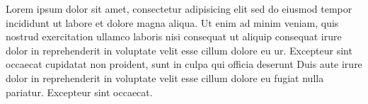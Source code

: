 \documentclass[a4paper, oneside, notitlepage, 12pt]{article}
\begin{document}
\begin{pages}
\begin{Rightside}
Lorem ipsum dolor sit amet, consectetur adipisicing elit
sed do eiusmod tempor incididunt ut labore et dolore
magna aliqua. Ut enim ad minim veniam, quis nostrud
exercitation ullamco laboris nisi
 consequat ut aliquip consequat\pend[]
 irure dolor in reprehenderit
in voluptate velit esse cillum dolore eu ur. Excepteur sint occaecat
cupidatat non proident, sunt in culpa qui officia deserunt
Duis aute irure dolor in reprehenderit
in voluptate velit esse cillum dolore eu fugiat nulla
pariatur. Excepteur sint occaecat.
\pend
\endnumbering
\end{Rightside}


\Pages
\end{pages}
\end{document}
